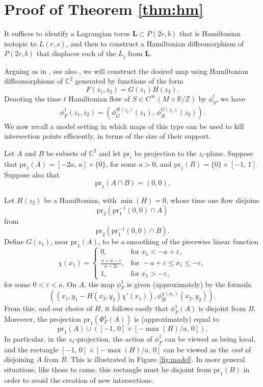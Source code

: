 \documentclass[12pt]{amsart}
\theoremstyle{definition}
\newcommand{\CC}{{\mathbb C}}
\newcommand{\RR}{{\mathbb R}}
\newcommand{\ZZ}{{\mathbb Z}}
\begin{document}
\section{Proof of Theorem \ref{thm:hm}}

It suffices to identify a Lagrangian torus $\mathbf{L} \subset P(2r,b)$ that is Hamiltonian isotopic to $L(r,s)$, and then to construct a Hamiltonian diffeomorphism of $P(2r,b)$ that  displaces each of the $L_j$ from $\mathbf{L}$.

\medskip

 Arguing as in \cite{ho}, see also \cite{hicksmak}, we will construct the desired map using Hamiltonian diffeomorphisms of $\CC^2$ generated by functions of the form $$F(z_1,z_2) = G(z_1)H(z_2).$$ Denoting the time $t$ Hamiltonian flow of  $S \in C^{\infty}(M\times \RR /\ZZ)$ by $\phi^t_S$, we have  
\begin{align}\label{move}
    \phi^1_F(z_1,z_2) = \left(\phi^{H(z_2)}_G (z_1),\, \phi^{G(z_1)}_H (z_2) \right).
\end{align} We now recall a model setting in which maps of this type can be used to kill intersection points efficiently, in terms of the size of their support. 

Let $A$ and $B$ be subsets of $\CC^2$ and let $\mathrm{pr}_i$ be projection to the $z_i$-plane. Suppose that $\mathrm{pr}_1(A) = [-2a,\,a ] \times \{0\}$, for some $a>0$, and  $\mathrm{pr}_1(B) = \{0 \} \times [-1,\, 1]$. 
Suppose also that $$\mathrm{pr}_1(A \cap B)=(0,0).$$ 





Let $H(z_2)$ be a Hamiltonian, with $\min(H)=0$, whose time one flow disjoins $$\mathrm{pr}_2(\mathrm{pr}_1^{-1}(0,0) \cap A)$$ from $$\mathrm{pr}_2(\mathrm{pr}_1^{-1}(0,0) \cap B).$$
Define $G(z_1)$, near $\mathrm{pr}_1(A)$, to be a smoothing of the piecewise linear function  $$\chi(x_1) = \begin{cases} 0, &\text{for } x_1<-a+\varepsilon , \\
\frac{x+a-\varepsilon}{a-2\varepsilon}, &\text{for } -a+\varepsilon \leq x_1 \leq -\varepsilon , \\1, &\text{for } x_1>-\varepsilon,
\end{cases}$$ for some $0<\varepsilon<a.$ 
On $A$, the map $\phi^1_F$ is given (approximately) by the formula $$((x_1, y_1- H(x_2,y_2)\chi'(x_1)),\phi^{\chi(x_1)}_H(x_2,y_2)).$$
From this, and our choice of $H$, it follows easily that $\phi^1_F(A)$ is disjoint from $B$. Moreover, the projection $\mathrm{pr}_1(\Phi^1_F(A))$ is (approximately) equal to 
$$\mathrm{pr}_1(A) \cup ([-1, \, 0] \times [-\max(H)/a,\, 0]).$$ In particular, in the $z_1$-projection, the action of $\phi^1_F$ can be viewed as being local, and the rectangle $[-1, \, 0] \times [-\max(H)/a,\,0]$ can be viewed as the {\it cost} of disjoining $A$ from $B$. This is illustrated in Figure \ref{fig:model}. In more general situations, like those to come, this rectangle must be disjoint from $\mathrm{pr}_1(B)$ in order to avoid the creation of new intersections.
\end{document}
